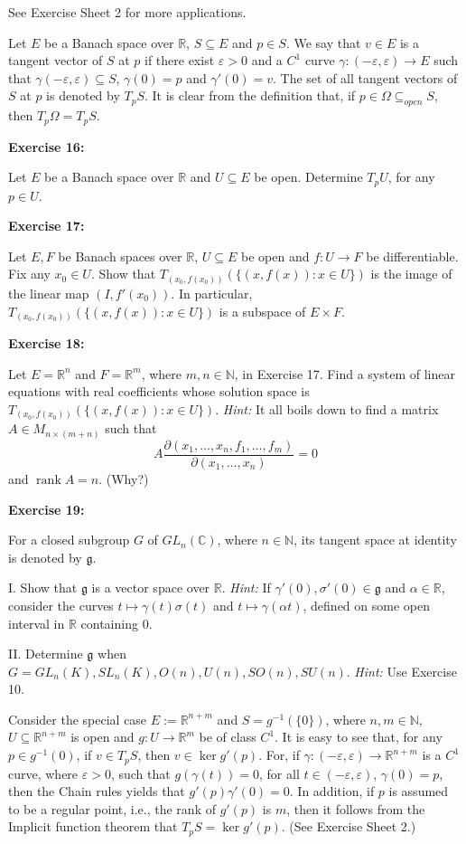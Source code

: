 \documentclass{book}
\begin{document}
See Exercise Sheet 2 for more applications.

Let $E$ be a Banach space over $\mathbb{R}$, $S \subseteq E$ and $p \in S$. We say that $v \in E$ is a tangent vector of $S$ at $p$ if there exist $\varepsilon > 0$ and a $C^1$ curve $\gamma : (-\varepsilon, \varepsilon) \to E$ such that $\gamma(-\varepsilon, \varepsilon) \subseteq S$, $\gamma(0) = p$ and $\gamma'(0) = v$. The set of all tangent vectors of $S$ at $p$ is denoted by $T_p S$. It is clear from the definition that, if $p \in \Omega \subseteq_{open} S$, then $T_p \Omega = T_p S$.

\textbf{Exercise 16:}

Let $E$ be a Banach space over $\mathbb{R}$ and $U \subseteq E$ be open. Determine $T_p U$, for any $p \in U$.

\textbf{Exercise 17:}

Let $E, F$ be Banach spaces over $\mathbb{R}$, $U \subseteq E$ be open and $f : U \to F$ be differentiable. Fix any $x_0 \in U$. Show that $T_{(x_0,f(x_0))}(\{(x, f(x)) : x \in U\})$ is the image of the linear map $(I, f'(x_0))$. In particular, $T_{(x_0,f(x_0))}(\{(x, f(x)) : x \in U\})$ is a subspace of $E \times F$.

\textbf{Exercise 18:}

Let $E = \mathbb{R}^n$ and $F = \mathbb{R}^m$, where $m, n \in \mathbb{N}$, in Exercise 17. Find a system of linear equations with real coefficients whose solution space is $T_{(x_0,f(x_0))}(\{(x, f(x)) : x \in U\})$. \textit{Hint:} It all boils down to find a matrix $A \in M_{n \times (m+n)}$ such that 
\[
A \frac{\partial (x_1,\ldots,x_n,f_1,\ldots,f_m)}{\partial (x_1,\ldots,x_n)} = 0
\]
and $\operatorname{rank} A = n$. (Why?)

\textbf{Exercise 19:}

For a closed subgroup $G$ of $GL_n(\mathbb{C})$, where $n \in \mathbb{N}$, its tangent space at identity is denoted by $\mathfrak{g}$.

I. Show that $\mathfrak{g}$ is a vector space over $\mathbb{R}$. \textit{Hint:} If $\gamma'(0), \sigma'(0) \in \mathfrak{g}$ and $\alpha \in \mathbb{R}$, consider the curves $t \mapsto \gamma(t)\sigma(t)$ and $t \mapsto \gamma(\alpha t)$, defined on some open interval in $\mathbb{R}$ containing $0$.

II. Determine $\mathfrak{g}$ when $G = GL_n(K), SL_n(K), O(n), U(n), SO(n), SU(n)$. \textit{Hint:} Use Exercise 10.

Consider the special case $E := \mathbb{R}^{n+m}$ and $S = g^{-1}(\{0\})$, where $n, m \in \mathbb{N}$, $U \subseteq \mathbb{R}^{n+m}$ is open and $g : U \to \mathbb{R}^m$ be of class $C^1$. It is easy to see that, for any $p \in g^{-1}(0)$, if $v \in T_p S$, then $v \in \ker g'(p)$. For, if $\gamma : (-\varepsilon, \varepsilon) \to \mathbb{R}^{n+m}$ is a $C^1$ curve, where $\varepsilon > 0$, such that $g(\gamma(t)) = 0$, for all $t \in (-\varepsilon, \varepsilon)$, $\gamma(0) = p$, then the Chain rules yields that $g'(p)\gamma'(0) = 0$. In addition, if $p$ is assumed to be a regular point, i.e., the rank of $g'(p)$ is $m$, then it follows from the Implicit function theorem that $T_p S = \ker g'(p)$. (See Exercise Sheet 2.)
\end{document}
